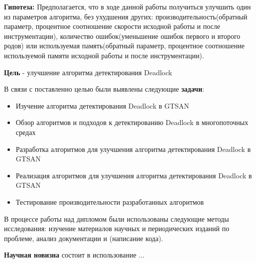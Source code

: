 \textbf{Гипотеза:} Предполагается, что в ходе данной работы получиться улучшить один из параметров алгоритма, без ухудшения других: производительность(обратный параметр, процентное соотношение скорости исходной работы и после инструментации), количество ошибок(уменьшение ошибок первого и второго родов) или используемая память(обратный параметр, процентное соотношение используемой памяти исходной работы и после инструментации).

\textbf{Цель} - улучшение алгоритма детектирования Deadlock

В связи с поставленно целью были выявлены следующие \textbf{задачи}:

\begin{itemize}  
\item Изучение алгоритма детектирования Deadlock в GTSAN
\item Обзор алгоритмов и подходов к детектированию Deadlock в многопоточных средах
\item Разработка алгоритмов для улучшения алгоритма детектирования Deadlock в GTSAN
\item Реализация алгоритмов для улучшения алгоритма детектирования Deadlock в GTSAN
\item Тестирование производительности разработанных алгоритмов
\end{itemize}

В процессе работы над дипломом были использованы следующие методы исследования: изучение материалов научных и периодических изданий по проблеме, анализ документации и (написание кода).

\textbf{Научная новизна} состоит в использование ...

\clearpage